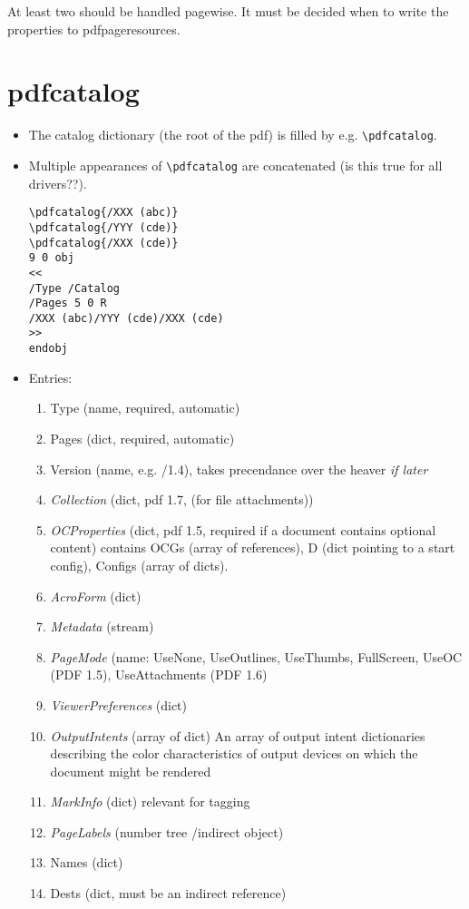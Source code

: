 \documentclass{article}
\begin{document}
At least two should be handled pagewise.
It must be decided when to write the properties to pdfpageresources.

\section{pdfcatalog}
\begin{itemize}
\item The catalog dictionary (the root of the pdf) is filled by e.g. \verb+\pdfcatalog+.
\item Multiple appearances of  \verb+\pdfcatalog+ are concatenated (is this true for all drivers??).

\begin{verbatim}
\pdfcatalog{/XXX (abc)}
\pdfcatalog{/YYY (cde)}
\pdfcatalog{/XXX (cde)}
9 0 obj
<<
/Type /Catalog
/Pages 5 0 R
/XXX (abc)/YYY (cde)/XXX (cde)
>>
endobj
\end{verbatim}

\item Entries:
\begin{enumerate}
  \item Type (name, required, automatic)
  \item Pages (dict, required, automatic)
  \item Version (name, e.g. /1.4), takes precendance over the heaver \emph{if later}
  \item \emph{Collection} (dict, pdf 1.7, (for file attachments))
  \item \emph{OCProperties} (dict, pdf 1.5, required if a document contains optional content)
        contains OCGs (array of references), D (dict pointing to a start config), Configs (array of dicts).
  \item \emph{AcroForm} (dict)
  \item \emph{Metadata} (stream)
  \item \emph{PageMode} (name: UseNone, UseOutlines, UseThumbs, FullScreen, UseOC (PDF 1.5),
   UseAttachments (PDF 1.6)
  \item \emph{ViewerPreferences} (dict)
  \item \emph{OutputIntents} (array of dict)
  An array of output intent dictionaries describing the color characteristics of output devices on which the document might be rendered
  \item \emph{MarkInfo} (dict) relevant for tagging
  \item \emph{PageLabels} (number tree /indirect object)
  \item Names (dict)
  \item Dests (dict, must be an indirect reference)


\end{enumerate}
\end{itemize}
\end{document}
